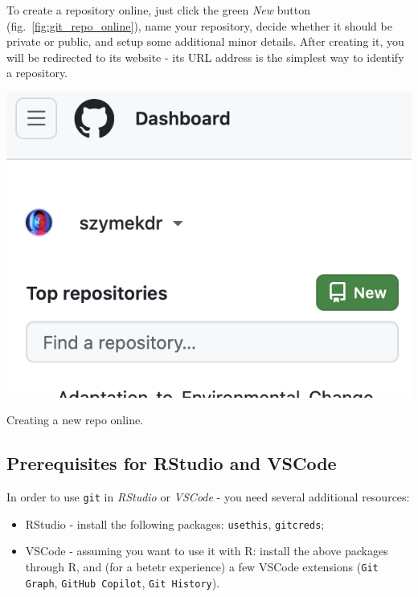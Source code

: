 \documentclass{tufte-handout}
\begin{document}
To create a repository online, just click the green \textit{New} button (fig.~\ref{fig:git_repo_online}), name your repository, decide whether it should be private or public, and setup some additional minor details. After creating it, you will be redirected to its website - its URL address is the simplest way to identify a repository.

\begin{marginfigure}
    \includegraphics[width=1\linewidth]{Zrzut ekranu 2024-12-20 o 11.57.42.png}
    \caption{Creating a new repo online.}
  \label{fig:git_repo_online}
\end{marginfigure}

\subsection{Prerequisites for RStudio and VSCode}

In order to use \texttt{git} in \textit{RStudio} or \textit{VSCode} - you need several additional resources:

\begin{itemize}
    \item RStudio - install the following packages: \texttt{usethis}, \texttt{gitcreds};
    \item VSCode - assuming you want to use it with \textsf{R}: install the above packages through \textsf{R}, and (for a betetr experience) a few VSCode extensions (\texttt{Git Graph}, \texttt{GitHub Copilot}, \texttt{Git History}).
\end{itemize}
\end{document}

